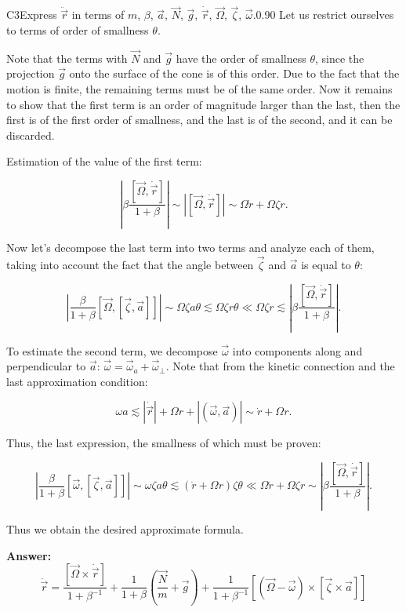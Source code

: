 \documentclass[11pt,a4paper]{article}
\begin{document}
\begin{solcard}{C3}{Express $\ddot{\vec r}$ in terms of $m$, $\beta$, $\vec a$, $\vec N$, $\vec g$, $\dot{\vec r}$, $\vec\Omega$, $\vec \zeta$, $\vec \omega$.}{0.90}
Let us restrict ourselves to terms of order of smallness $\theta$.


Note that the terms with $\vec N$ and $\vec g$ have the order of smallness $\theta$, since the projection $\vec g$ onto the surface of the cone is of this order. Due to the fact that the motion is finite, the remaining terms must be of the same order. Now it remains to show that the first term is an order of magnitude larger than the last, then the first is of the first order of smallness, and the last is of the second, and it can be discarded.


Estimation of the value of the first term:


$$\left|\beta\frac{[\vec \Omega, \dot{\vec r}]}{1 + \beta}\right|\sim \left|[\vec \Omega, \dot{\vec r}]\right|\sim \Omega \dot r + \Omega \zeta r.$$


Now let’s decompose the last term into two terms and analyze each of them, taking into account the fact that the angle between $\vec\zeta$ and $\vec a$ is equal to $\theta$:


$$\left|\frac{\beta}{1 + \beta}\left[\vec \Omega, \left[\vec \zeta, \vec a\right]\right]\right|\sim\Omega\zeta a\theta \lesssim \Omega\zeta r\theta \ll \Omega\zeta r \lesssim \left|\beta\frac{[\vec \Omega, \dot{\vec r}]}{1 + \beta}\right|.$$


To estimate the second term, we decompose $\vec\omega$ into components along and perpendicular to $\vec a$: $\vec \omega = \vec \omega_a + \vec \omega_\perp$. Note that from the kinetic connection and the last approximation condition:


$$\omega a \lesssim \left|\dot{\vec r}\right|+\Omega r +\left|\left(\vec\omega, \vec a\right) \right|\sim \dot r + \Omega r.$$


Thus, the last expression, the smallness of which must be proven:


$$\left|\frac{\beta}{1 + \beta}\left[\vec \omega, \left[\vec \zeta, \vec a\right]\right]\right|\sim\omega\zeta a\theta \lesssim \left(\dot r + \Omega r\right)\zeta \theta \ll \Omega \dot r + \Omega \zeta r\sim \left|\beta\frac{[\vec \Omega, \dot{\vec r}]}{1 + \beta}\right|.$$


Thus we obtain the desired approximate formula.

\par\smallskip\noindent\textbf{Answer:} $$ \ddot{\vec r} = \frac{[\vec \Omega \times \dot{\vec r}]}{1 + \beta^{-1}} + \frac{1}{1 + \beta} \left( \frac{\vec N}{m} + \vec g\right) + \frac{1}{1 + \beta^{-1}} \left[\left(\vec \Omega - \vec \omega\right) \times \left[\vec \zeta \times \vec a\right]\right] $$
\end{solcard}
\end{document}
